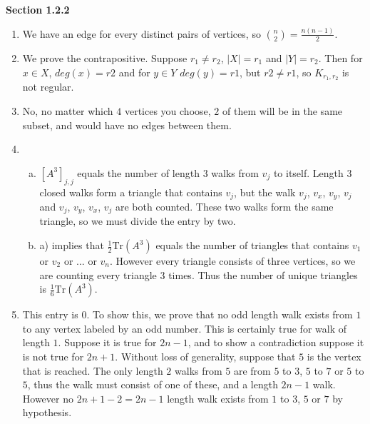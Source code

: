 \documentclass[11pt]{article}
\begin{document}
{\bfseries Section 1.2.2}

\begin{enumerate}[1]
    \item %
        We have an edge for every distinct pairs of vertices, so
        $\binom{n}{2} = \frac{n(n-1)}{2}$.
    \item %
        We prove the contrapositive. Suppose $r_1 \neq r_2$, $|X| = r_1$ and 
        $|Y| = r_2$. Then for $x \in X$, $deg(x) = r2$ and for $y \in Y$ 
        $deg(y) = r1$, but $r2 \neq r1$, so $K_{r_1, r_2}$ is not regular.
    \item %
        No, no matter which $4$ vertices you choose, $2$ of them will be in the 
        same subset, and would have no edges between them. 
    \item %
        \begin{enumerate}[a)]
            \item
                $[A^3]_{j,j}$ equals the number of length $3$ walks from $v_j$ to 
                itself. Length $3$ closed walks form a triangle that contains 
                $v_j$, but the walk $v_j$, $v_x$, $v_y$, $v_j$ and 
                $v_j$, $v_y$, $v_x$, $v_j$ are both counted. These two walks form the 
                same triangle, so we must divide the entry by two. 
            \item
                a) implies that $\frac{1}{2}\text{Tr}(A^3)$ equals the number of 
                triangles that contains $v_1$ or $v_2$ or ... or $v_n$. However 
                every triangle consists of three vertices, so we are counting 
                every triangle 3 times. Thus the number of unique triangles is 
                $\frac{1}{6}\text{Tr}(A^3)$.
        \end{enumerate}
    \item %
        This entry is $0$. To show this, we prove that no odd length walk exists from 
        $1$ to any vertex labeled by an odd number. This is certainly true for walk of 
        length $1$. Suppose it is true for $2n - 1$, and to show a contradiction 
        suppose it is not true for $2n + 1$. Without loss of generality, suppose that 
        $5$ is the vertex that is reached. The only length $2$ walks from $5$ are 
        from $5$ to $3$, $5$ to $7$ or $5$ to $5$, thus the walk must consist of one 
        of these, and a length $2n - 1$ walk. However no $2n + 1 - 2 = 2n - 1$ length
        walk exists from $1$ to $3$, $5$ or $7$ by hypothesis. 


\end{enumerate}
\end{document}
